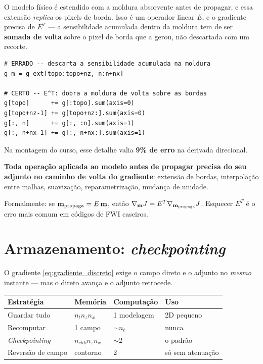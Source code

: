 \documentclass[11pt,a4paper,oneside]{report}
\begin{document}
\begin{armadilha}
O modelo f\'isico \'e estendido com a moldura absorvente antes de propagar, e
essa extens\~ao \emph{replica} os pixels de borda. Isso \'e um operador linear
$E$, e o gradiente precisa de $E^{T}$ --- a sensibilidade acumulada dentro da
moldura tem de ser \textbf{somada de volta} sobre o pixel de borda que a
gerou, n\~ao descartada com um recorte.

\begin{lstlisting}
# ERRADO -- descarta a sensibilidade acumulada na moldura
g_m = g_ext[topo:topo+nz, n:n+nx]

# CERTO -- E^T: dobra a moldura de volta sobre as bordas
g[topo]      += g[:topo].sum(axis=0)
g[topo+nz-1] += g[topo+nz:].sum(axis=0)
g[:, n]      += g[:, :n].sum(axis=1)
g[:, n+nx-1] += g[:, n+nx:].sum(axis=1)
\end{lstlisting}

Na montagem do curso, esse detalhe valia \textbf{9\% de erro} na derivada
direcional.
\end{armadilha}

\begin{teoria}
\textbf{Toda opera\c{c}\~ao aplicada ao modelo antes de propagar precisa do
seu adjunto no caminho de volta do gradiente}: extens\~ao de bordas,
interpola\c{c}\~ao entre malhas, suaviza\c{c}\~ao, reparametriza\c{c}\~ao,
mudan\c{c}a de unidade.

Formalmente: se $\mathbf{m}_{\text{propaga}} = E\,\mathbf{m}$, ent\~ao
$\nabla_{\mathbf{m}} J = E^{T}\nabla_{\mathbf{m}_{\text{propaga}}} J$. Esquecer $E^{T}$
\'e o erro mais comum em c\'odigos de FWI caseiros.
\end{teoria}

\section{Armazenamento: \emph{checkpointing}}

O gradiente \eqref{eq:gradiente_discreto} exige o campo direto e o adjunto no
\emph{mesmo} instante --- mas o direto avan\c{c}a e o adjunto retrocede.

\begin{center}
\begin{tabular}{@{}llll@{}}
\toprule
\textbf{Estrat\'egia} & \textbf{Mem\'oria} & \textbf{Computa\c{c}\~ao}
& \textbf{Uso} \\
\midrule
Guardar tudo      & $n_t n_z n_x$     & 1 modelagem & 2D pequeno \\
Recomputar        & 1 campo           & $\sim n_t$  & nunca \\
\emph{Checkpointing} & $n_{chk} n_z n_x$ & $\sim 2$ & o padr\~ao \\
Revers\~ao de campo & contorno        & 2 & s\'o sem atenua\c{c}\~ao \\
\bottomrule
\end{tabular}
\end{center}
\end{document}
